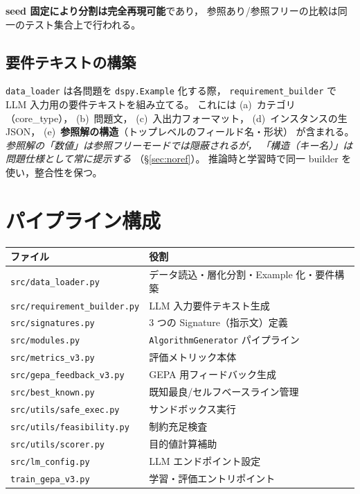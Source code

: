 \documentclass[uplatex,dvipdfmx,a4paper,11pt]{jsarticle}
\begin{document}
\textbf{seed 固定により分割は完全再現可能}であり，
参照あり/参照フリーの比較は同一のテスト集合上で行われる。

\subsection{要件テキストの構築}

\texttt{data\_loader} は各問題を \texttt{dspy.Example} 化する際，
\texttt{requirement\_builder} で LLM 入力用の要件テキストを組み立てる。
これには
(a)~カテゴリ（core\_type），
(b)~問題文，
(c)~入出力フォーマット，
(d)~インスタンスの生 JSON，
(e)~\textbf{参照解の構造}（トップレベルのフィールド名・形状）
が含まれる。
\emph{参照解の「数値」は参照フリーモードでは隠蔽されるが，
「構造（キー名）」は問題仕様として常に提示する}
（\S\ref{sec:noref}）。
推論時と学習時で同一 builder を使い，整合性を保つ。

\section{パイプライン構成}\label{sec:pipeline}

\begin{center}
\begin{tabular}{ll}
  \toprule
  ファイル & 役割 \\
  \midrule
  \texttt{src/data\_loader.py} & データ読込・層化分割・Example 化・要件構築 \\
  \texttt{src/requirement\_builder.py} & LLM 入力要件テキスト生成 \\
  \texttt{src/signatures.py} & 3 つの Signature（指示文）定義 \\
  \texttt{src/modules.py} & \texttt{AlgorithmGenerator} パイプライン \\
  \texttt{src/metrics\_v3.py} & 評価メトリック本体 \\
  \texttt{src/gepa\_feedback\_v3.py} & GEPA 用フィードバック生成 \\
  \texttt{src/best\_known.py} & 既知最良/セルフベースライン管理 \\
  \texttt{src/utils/safe\_exec.py} & サンドボックス実行 \\
  \texttt{src/utils/feasibility.py} & 制約充足検査 \\
  \texttt{src/utils/scorer.py} & 目的値計算補助 \\
  \texttt{src/lm\_config.py} & LLM エンドポイント設定 \\
  \texttt{train\_gepa\_v3.py} & 学習・評価エントリポイント \\
  \bottomrule
\end{tabular}
\end{center}
\end{document}
